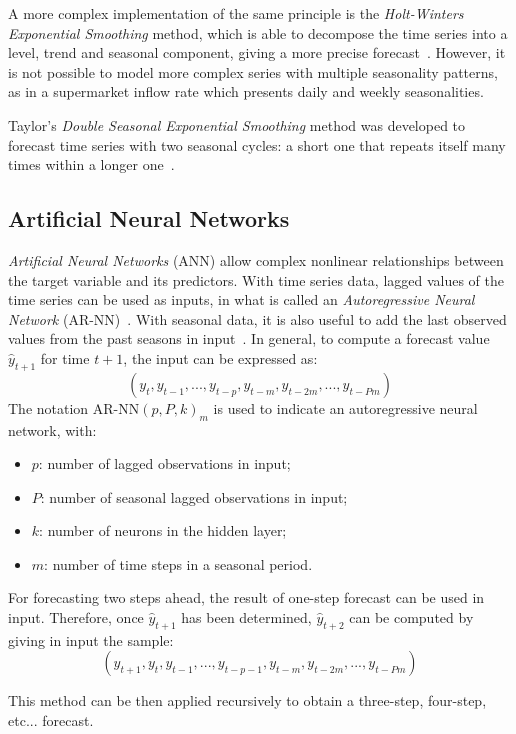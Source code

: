 A more complex implementation of the same principle is the \emph{Holt-Winters Exponential Smoothing} method, which is able to decompose the time series into a level, trend and seasonal component, giving a more precise forecast~\cite{holt}. However, it is not possible to model more complex series with multiple seasonality patterns, as in a supermarket inflow rate which presents daily and weekly seasonalities.

Taylor’s \emph{Double Seasonal Exponential Smoothing} method was developed to forecast time series with two seasonal cycles: a short one that repeats itself many times within a longer one~\cite{taylor}.

\subsection{Artificial Neural Networks}
\label{subsec:artificial_neural_networks}

\emph{Artificial Neural Networks} (ANN) allow complex nonlinear relationships between the target variable and its predictors. With time series data, lagged values of the time series can be used as inputs, in what is called an \emph{Autoregressive Neural Network} (AR-NN)~\cite{tang}. With seasonal data, it is also useful to add the last observed values from the past seasons in input~\cite{hyndman2018}. In general, to compute a forecast value \( \hat{y}_{t+1} \) for time \( t+1 \), the input can be expressed as:
\[
  (y_{t}, y_{t-1}, ..., y_{t-p}, y_{t-m}, y_{t-2m}, ..., y_{t-Pm})
\]
The notation \( \text{AR-NN}(p, P, k)_m \) is used to indicate an autoregressive neural network, with:
\begin{itemize}
  \item \( p \): number of lagged observations in input;
  \item \( P \): number of seasonal lagged observations in input;
  \item \( k \): number of neurons in the hidden layer;
  \item \( m \): number of time steps in a seasonal period.
\end{itemize}

For forecasting two steps ahead, the result of one-step forecast can be used in input. Therefore, once \( \hat{y}_{t+1} \) has been determined, \( \hat{y}_{t+2} \) can be computed by giving in input the sample:
\[ (\hat{y}_{t+1}, y_{t}, y_{t-1}, ..., y_{t-p-1}, y_{t-m}, y_{t-2m}, ..., y_{t-Pm}) \]

This method can be then applied recursively to obtain a three-step, four-step, etc... forecast.

